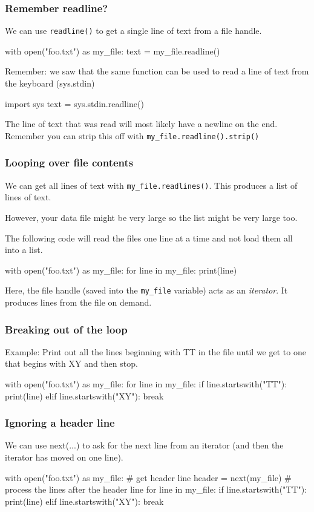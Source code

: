 \documentclass{beamer}
\begin{document}
\begin{frame}[fragile]
\frametitle{Remember readline?}
We can use \lstinline{readline()} to get a single line of text from a file handle. 
\begin{code}
with open("foo.txt") as my_file:
   text = my_file.readline()
\end{code}
Remember: we saw that the same function can be used to read a line of text from the keyboard (sys.stdin)
\begin{code}
import sys
text = sys.stdin.readline()
\end{code}
The line of text that was read will most likely have a newline on the end. Remember you can strip this off with \texttt{my\_file.readline().strip()}
\end{frame}


\begin{frame}[fragile]
\frametitle{Looping over file contents}
We can get all lines of text with \texttt{my\_file.readlines()}. This produces a list of lines of text. 

However, your data file might be very large so the list might be very large too. 

The following code will read the files one line at a time and not load them all into a list.

\begin{code}
with open("foo.txt") as my_file:
   for line in my_file:
      print(line)
\end{code}

Here, the file handle (saved into the \texttt{my\_file} variable) acts as an \textit{iterator}. It produces lines from the file on demand.
\end{frame}

\begin{frame}[fragile]
\frametitle{Breaking out of the loop}
Example: Print out all the lines beginning with TT in the file until we get to one that begins with XY and then stop.
\begin{code}
with open("foo.txt") as my_file:
   for line in my_file:
      if line.startswith("TT"):
         print(line)
      elif line.startswith("XY"):
         break
\end{code}
\end{frame}

\begin{frame}[fragile]
\frametitle{Ignoring a header line}
We can use next(...) to ask for the next line from an iterator (and then the iterator has moved on one line).
\begin{code}
with open("foo.txt") as my_file:
   # get header line
   header = next(my_file)
   # process the lines after the header line
   for line in my_file:  
      if line.startswith("TT"):
         print(line)
      elif line.startswith("XY"):
         break
\end{code}
\end{frame}
\end{document}
